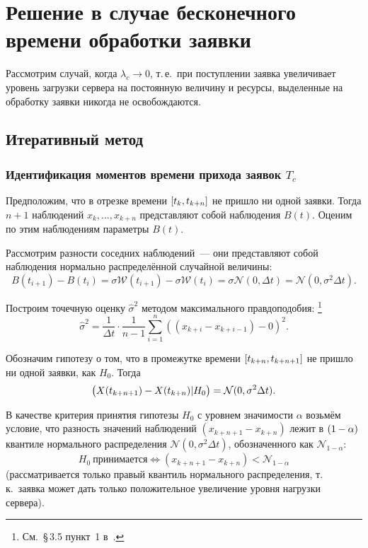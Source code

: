 \documentclass[a4paper,10pt]{article}
\begin{document}
\section{Решение в случае бесконечного времени обработки заявки}
Рассмотрим случай, когда $\lambda_c \rightarrow 0$, 
т.\,е.~при поступлении заявка увеличивает уровень загрузки 
сервера на постоянную величину и ресурсы, выделенные на обработку заявки
никогда не освобождаются.

\subsection{Итеративный метод}%
\label{iterative}
\subsubsection{Идентификация моментов времени прихода заявок $T_c$}%
\label{lc0-iter-Tc}
Предположим, что в отрезке времени $\sbr{t_k, t_{k+n}}$ 
не пришло ни одной заявки.
Тогда $n + 1$ наблюдений $x_k,\ldots,x_{k+n}$ представляют собой наблюдения
$B(t)$.
Оценим по этим наблюдениям параметры $B(t)$.

Рассмотрим разности соседних наблюдений~--- они представляют собой наблюдения 
нормально распределённой случайной величины:
$$B(t_{i+1}) - B(t_i) = 
    \sigma \mathcal{W}(t_{i+1}) - \sigma \mathcal{W}(t_i) = 
    \sigma \mathcal{N}(0, \Delta t) = 
    \mathcal{N}(0, \sigma^2 \Delta t).$$

Построим точечную оценку $\widehat{\sigma}^2$ 
методом максимального правдоподобия:%
\footnote{См.~\S\,3.5 пункт~1 в~\cite{ivchmed2010matstat}.}
%
$$\widehat{\sigma}^2 = 
    \frac{1}{\Delta t}\cdot\frac{1}{n-1}
        \sum\limits_{i=1}^n ((x_{k+i} - x_{k+i-1}) - 0)^2.$$

Обозначим гипотезу о том, что в промежутке времени 
$\sbr{t_{k+n}, t_{k+n+1}}$ не пришло ни одной заявки, 
как $H_0$.
Тогда 
$$\del{X(t_{k+n+1})-X(t_{k+n}) \vert H_0} = 
    \mathcal{N}(0, \sigma^2 \Delta t).$$

В качестве критерия принятия гипотезы $H_0$ с уровнем значимости 
$\alpha$ 
возьмём условие, что разность значений наблюдений $(x_{k+n+1}-x_{k+n})$
лежит в $\del{1 - \alpha}$ квантиле
нормального распределения $\mathcal{N}(0, \sigma^2 \Delta t)$,
обозначенного как $\mathcal{N}_{1 - \alpha}$:
$$
H_0 \  \mathrm{\text{принимается}} \iff
        (x_{k+n+1}-x_{k+n}) < 
	    \mathcal{N}_{1 - \alpha}
$$
(рассматривается только правый квантиль нормального распределения, 
т.\,к.~заявка может дать только положительное увеличение уровня нагрузки 
сервера).
\end{document}

